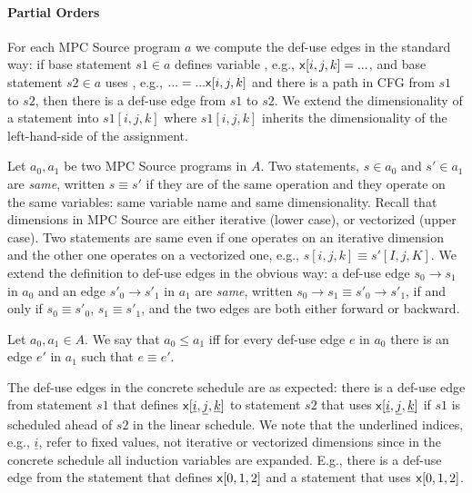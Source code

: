 \paragraph{Partial Orders}

For each MPC Source program $a$ we compute the def-use edges in the standard way: if base statement $s1 \in a$ defines variable \x, e.g., ${\sf {x}}[i,j,k] = ...$, 
and base statement $s2 \in a$ uses \x, e.g., $... = ... {\sf {x}}[i,j,k]$ and there is a path in CFG from $s1$ to $s2$, then there is a def-use edge from
 $s1$ to $s2$. We extend the dimensionality of a statement into $s1[i,j,k]$ where $s1[i,j,k]$ inherits the dimensionality of the left-hand-side of the assignment.
  
  
 Let $a_0, a_1$ be two MPC Source programs in $A$. 
 Two statements, $s \in a_0$ and $s' \in a_1$ are \emph{same}, written $s \equiv s'$ if they are of the same operation and they operate on 
 the same variables: same variable name and same dimensionality. Recall that dimensions in MPC Source are either iterative (lower case), or vectorized (upper case). 
 Two statements are same even if one operates on an iterative dimension and the other one operates on a vectorized one, e.g., $s[i,j,k] \equiv s'[I,j,K]$.
 We extend the definition to def-use edges in the obvious way: a def-use edge $s_0 \rightarrow s_1$ in $a_0$ and an edge $s'_0 \rightarrow s'_1$ in $a_1$
 are \emph{same}, written $s_0 \rightarrow s_1 \equiv s'_0 \rightarrow s'_1$, if and only if $s_0 \equiv s'_0$, $s_1 \equiv s'_1$, and the two edges are both either 
 forward or backward. 
  
\begin{definition} Let $a_0, a_1 \in A$. We say that $a_0 \le a_1$ iff for every def-use edge $e$ in $a_0$ there is an edge
$e'$ in $a_1$ such that $e \equiv e'$.
\end{definition}
 
 The def-use edges in the concrete schedule are as expected: there is a def-use edge from statement $s1$ that defines ${\sf {x}}[\underline{i},\underline{j},\underline{k}]$
 to statement $s2$ that uses ${\sf {x}}[\underline{i},\underline{j},\underline{k}]$ if $s1$ is scheduled ahead of $s2$ in the linear schedule. We note that the underlined
 indices, e.g., $\underline{i}$, refer to fixed values, not iterative or vectorized dimensions since in the concrete schedule all induction variables are expanded. 
 E.g., there is a def-use edge from the statement that defines ${\sf {x}}[0,1,2]$ and a statement that uses ${\sf {x}}[0,1,2]$.
 
